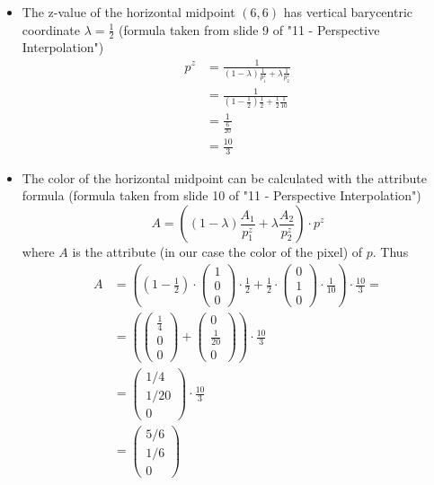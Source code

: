 \documentclass[a4paper, 11pt]{article}
\begin{document}
\begin{itemize}
	\item The z-value of the horizontal midpoint $(6, 6)$ has vertical
	      barycentric coordinate $\lambda = \frac{1}{2}$ (formula taken from slide
	      9 of "11 - Perspective Interpolation")
	      \begin{align*}
		      p^z & = \frac{1}{ (1-\lambda)  \frac{1}{p_1^z} + \lambda \frac{1}{p_2^z} } \\
		          & = \frac{1}{ (1- \frac{1}{2})  \frac{1}{2} + \frac{1}{2} \frac{1}{10}
		      }                                                                          \\
		          & = \frac{1}{ \frac{6}{20} }                                           \\
		          & = \frac{10}{3}
	      \end{align*}

	\item The color of the horizontal midpoint can be calculated with the
	      attribute formula (formula taken from slide
	      10 of "11 - Perspective Interpolation")
	      $$ A = \left((1 - \lambda) \frac{A_1}{p_1^z} + \lambda \frac{A_2}{p_2^z}\right)
		      \cdot p^z $$
	      where $A$ is the attribute (in our case the color of the pixel) of $p$.
	      Thus
	      \begin{align*}
		      A & = \left(\left( 1 - \frac{1}{2} \right) \cdot
		      \begin{pmatrix} 1\\ 0\\ 0 \end{pmatrix}
		      \cdot \frac{1}{2} + \frac{1}{2} \cdot
		      \begin{pmatrix} 0\\ 1\\0 \end{pmatrix}
		      \cdot \frac{1}{10} \right) \cdot \frac{10}{3} =             \\
		        & = \left(
		      \begin{pmatrix} \frac{1}{4} \\ 0 \\ 0 \end{pmatrix}
		      +
		      \begin{pmatrix} 0 \\ \frac{1}{20} \\ 0 \end{pmatrix}
		      \right) \cdot \frac{10}{3}                                  \\
		        & =
		      \begin{pmatrix} 1/4 \\ 1/20 \\ 0 \end{pmatrix}
		      \cdot \frac{10}{3}                                          \\
		        & =
		      \begin{pmatrix} 5/6 \\ 1/6 \\ 0 \end{pmatrix}
	      \end{align*}

\end{itemize}
\end{document}
